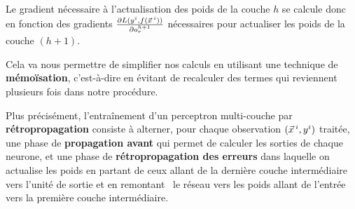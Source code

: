 Le gradient nécessaire à l'actualisation des poids de la couche $h$ se
calcule donc en fonction des gradients
$\frac{\partial L(y^i, f(\xx^i))}{\partial o^{h+1}_r}$ nécessaires pour
actualiser les poids de la couche $(h+1)$.

Cela va nous permettre de simplifier nos calculs en utilisant une technique de
\textbf{mémoïsation}, c'est-à-dire en évitant de recalculer des termes qui
reviennent plusieurs fois dans notre procédure.

Plus précisément, l'entraînement d'un perceptron multi-couche par
\textbf{rétropropagation} consiste à alterner, pour chaque observation
$(\xx^i, y^i)$ traitée, une phase de \textbf{propagation avant} qui permet de
calculer les sorties de chaque neurone, et une phase de
\textbf{rétropropagation des erreurs} dans laquelle on actualise les poids en
partant de ceux allant de la dernière couche intermédiaire vers l'unité de
sortie et en \og remontant \fg~le réseau vers les poids allant de l'entrée vers
la première couche intermédiaire.

